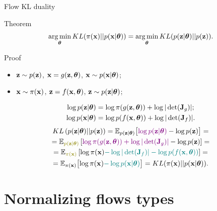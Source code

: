 \begin{frame}{Flow KL duality}
	\begin{block}{Theorem}
		\vspace{-0.3cm}
		\[
			\operatorname*{arg\,min}_{\boldsymbol{\theta}} KL(\pi(\mathbf{x}) || p(\mathbf{x} | \boldsymbol{\theta})) = \operatorname*{arg\,min}_{\boldsymbol{\theta}} KL(p(\mathbf{z} | \boldsymbol{\theta}) || p(\mathbf{z})).
		\]
		\vspace{-0.5cm}
	\end{block}
	\begin{block}{Proof}
		\begin{itemize}
			\item $\mathbf{z} \sim p(\mathbf{z})$, $\mathbf{x} = g(\mathbf{z}, \boldsymbol{\theta})$, $\mathbf{x} \sim p(\mathbf{x}| \boldsymbol{\theta})$;
			\item $\mathbf{x} \sim \pi(\mathbf{x})$, $\mathbf{z} = f(\mathbf{x}, \boldsymbol{\theta})$, $\mathbf{z} \sim p(\mathbf{z} | \boldsymbol{\theta})$;
		\end{itemize}
		\vspace{-0.3cm}
		\begin{align*}
			\log p(\mathbf{z} | \boldsymbol{\theta}) &= \log \pi(g(\mathbf{z}, \boldsymbol{\theta})) + \log | \det ( \mathbf{J}_g) |; \\
			\log p(\mathbf{x} | \boldsymbol{\theta}) &= \log p(f(\mathbf{x}, \boldsymbol{\theta})) + \log | \det ( \mathbf{J}_f) |.
		\end{align*}
		\vspace{-0.9cm}
		\begin{multline*}
			KL\left(p(\bz | \btheta) || p(\bz) \right) = \mathbb{E}_{p(\bz | \btheta)} \bigl[ {\color{violet}\log p(\bz | \btheta)} - \log p(\bz) \bigr] = \\ 
			= \mathbb{E}_{{\color{olive}p(\bz | \btheta)}} \left[ {\color{violet}\log \pi(g(\bz, \btheta)) +  \log |\det (\bJ_g)|} - \log p(\bz) \right] = \\
			= \mathbb{E}_{{\color{olive}\pi(\bx)}} \left[ \log \pi(\bx) {\color{teal} - \log |\det (\bJ_f)| - \log p(f(\bx, \btheta))} \right] = \\
			= \mathbb{E}_{\pi(\bx)} \bigl[ \log \pi(\bx) {\color{teal} -\log p(\bx | \btheta)} \bigr] = KL (\pi(\bx) || p(\bx | \btheta)).
		\end{multline*}
	\end{block}
\end{frame}
\section{Normalizing flows types}
